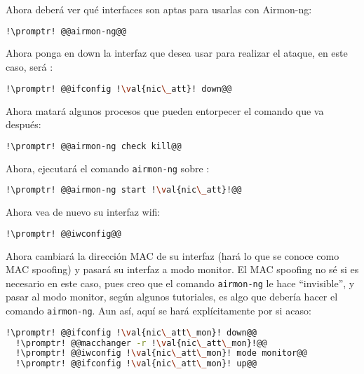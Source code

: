 Ahora deberá ver qué interfaces son aptas para usarlas con Airmon-ng:

\begin{lstlisting}[gobble=2,language=bash,style=bashinteract,escapechar=!]
  !\promptr! @@airmon-ng@@
\end{lstlisting}

Ahora ponga en down la interfaz que desea usar para realizar el ataque, en este caso, será :

\begin{lstlisting}[gobble=2,language=bash,style=bashinteract,escapechar=!]
  !\promptr! @@ifconfig !\val{nic\_att}! down@@
\end{lstlisting}

Ahora matará algunos procesos que pueden entorpecer el comando que va después:

\begin{lstlisting}[gobble=2,language=bash,style=bashinteract,escapechar=!]
  !\promptr! @@airmon-ng check kill@@
\end{lstlisting}

Ahora, ejecutará el comando \lstinline!airmon-ng! sobre :

\begin{lstlisting}[gobble=2,language=bash,style=bashinteract,escapechar=!]
  !\promptr! @@airmon-ng start !\val{nic\_att}!@@
\end{lstlisting}

Ahora vea de nuevo su interfaz wifi:

\begin{lstlisting}[gobble=2,language=bash,style=bashinteract,escapechar=!]
  !\promptr! @@iwconfig@@
\end{lstlisting}

Ahora cambiará la dirección MAC de su interfaz (hará lo que se conoce como MAC spoofing) y pasará su interfaz a
modo monitor. El MAC spoofing no sé si es necesario en este caso, pues creo que el comando \lstinline!airmon-ng!
le hace ``invisible'', y pasar al modo monitor, según algunos tutoriales, es algo que debería hacer el comando
\lstinline!airmon-ng!. Aun así, aquí se hará explícitamente por si acaso:

\begin{lstlisting}[gobble=2,language=bash,style=bashinteract,escapechar=!]
  !\promptr! @@ifconfig !\val{nic\_att\_mon}! down@@
  !\promptr! @@macchanger -r !\val{nic\_att\_mon}!@@
  !\promptr! @@iwconfig !\val{nic\_att\_mon}! mode monitor@@
  !\promptr! @@ifconfig !\val{nic\_att\_mon}! up@@
\end{lstlisting}

